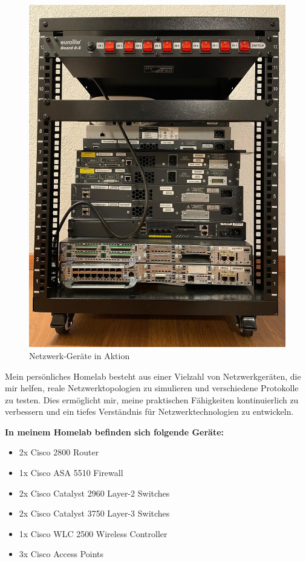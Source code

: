 \documentclass[11pt, a4paper]{awesome-cv}
\begin{document}
\begin{cvletter}
\begin{figure}[h!]
\begin{minipage}{0.48\textwidth}
        \includegraphics[width=\textwidth]{./foto_lab/lab3.jpg}
        \caption{Netzwerk-Geräte in Aktion}
        \label{fig:lab2}
    \end{minipage}
\end{figure}

\vspace{0.5cm}


Mein persönliches Homelab besteht aus einer Vielzahl von Netzwerkgeräten, die mir helfen, reale Netzwerktopologien zu simulieren und verschiedene Protokolle zu testen. Dies ermöglicht mir, meine praktischen Fähigkeiten kontinuierlich zu verbessern und ein tiefes Verständnis für Netzwerktechnologien zu entwickeln.

\textbf{In meinem Homelab befinden sich folgende Geräte:}
\begin{itemize}
    \item 2x Cisco 2800 Router
    \item 1x Cisco ASA 5510 Firewall
    \item 2x Cisco Catalyst 2960 Layer-2 Switches
    \item 2x Cisco Catalyst 3750 Layer-3 Switches
    \item 1x Cisco WLC 2500 Wireless Controller
    \item 3x Cisco Access Points
\end{itemize}



\end{cvletter}
\end{document}
